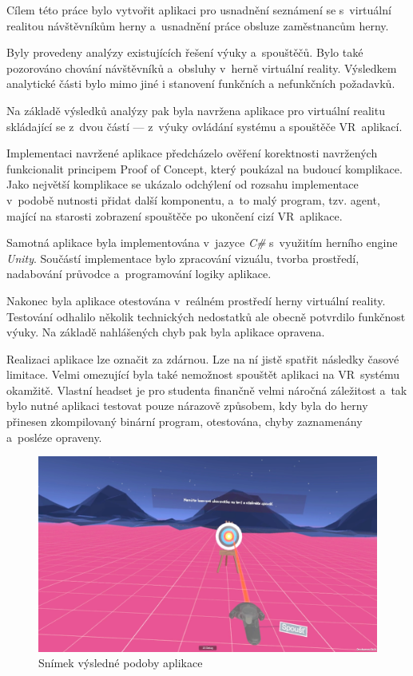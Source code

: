Cílem této práce bylo vytvořit aplikaci pro usnadnění seznámení se
s~virtuální realitou návštěvníkům herny a~usnadnění práce obsluze zaměstnancům herny.

Byly provedeny analýzy existujících řešení výuky a~spouštěčů. Bylo také
pozorováno chování návštěvníků a~obsluhy v~herně virtuální reality.
Výsledkem analytické části bylo mimo jiné i stanovení funkčních a
nefunkčních požadavků.

Na základě výsledků analýzy pak byla navržena aplikace pro virtuální
realitu skládající se z~dvou částí --- z~výuky ovládání systému a
spouštěče VR~aplikací.

Implementaci navržené aplikace předcházelo ověření korektnosti
navržených funkcionalit principem Proof of Concept, který poukázal na
budoucí komplikace. Jako největší komplikace se ukázalo odchýlení od
rozsahu implementace v~podobě nutnosti přidat další komponentu, a~to
malý program, tzv. agent, mající na starosti zobrazení spouštěče po
ukončení cizí VR~aplikace.

Samotná aplikace byla implementována v~jazyce \emph{C\#} s~využitím herního
engine \emph{Unity}. Součástí implementace bylo zpracování vizuálu, tvorba
prostředí, nadabování průvodce a~programování logiky aplikace.

Nakonec byla aplikace otestována v~reálném prostředí herny virtuální
reality. Testování odhalilo několik technických nedostatků ale obecně
potvrdilo funkčnost výuky. Na základě nahlášených chyb pak byla aplikace
opravena.

Realizaci aplikace lze označit za zdárnou. Lze na ní jistě spatřit
následky časové limitace. Velmi omezující byla také nemožnost spouštět
aplikaci na VR~systému okamžitě. Vlastní headset je pro studenta
finančně velmi náročná záležitost a~tak bylo nutné aplikaci testovat
pouze nárazově způsobem, kdy byla do herny přinesen zkompilovaný
binární program, otestována, chyby zaznamenány a~posléze opraveny.

\begin{figure}[h!]
\centering
\includegraphics[width=12cm]{src/assets/result.png}
\caption{Snímek výsledné podoby aplikace}
\end{figure}

